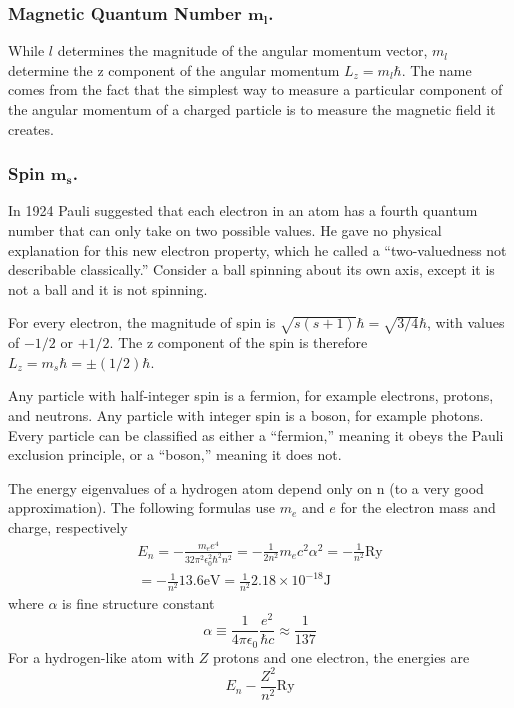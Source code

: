 \documentclass[../../../main.tex]{subfiles}
\begin{document}
\subsubsection{Magnetic Quantum Number $\boldsymbol{m_l}$.}  While $l$ determines the magnitude of the angular momentum vector, $m_l$ determine the z component of the angular momentum $L_z = m_l \hbar$. The name comes from the fact that the simplest way to measure a particular component of the angular momentum of a charged particle is to measure the magnetic field it creates.

\subsubsection{Spin $\boldsymbol{m_s}$.} In 1924 Pauli suggested that each electron in an atom has a fourth quantum number that can only take on two possible values. He gave no physical explanation for this new electron property, which he called a “two-valuedness not describable classically.” Consider a ball spinning about its own axis, except it is not a ball and it is not spinning.

For every electron, the magnitude of spin is $\sqrt{s(s + 1)}\hbar=\sqrt{3/4}\hbar$, with values of $-1/2$ or $+1/2$. The z component of the spin is therefore $L_z= m_s\hbar=\pm(1/2)\hbar$.

Any particle with half-integer spin is a fermion, for example electrons, protons, and neutrons. Any particle with integer spin is a boson, for example photons. Every particle can be classified as either a “fermion,” meaning it obeys the Pauli exclusion principle, or a “boson,” meaning it does not. 

The energy eigenvalues of a hydrogen atom depend only on n (to a very good approximation). The  following formulas use $m_e$ and $e$ for the electron mass and charge, respectively
\begin{multline*}
    E_n=-\frac{m_ee^4}{32\pi^2\epsilon_0^2
    \hbar^2n^2}=-\frac{1}{2n^2}m_ec^2\alpha^2 = -\frac{1}{n^2}\text{Ry}\\
    = -\frac{1}{n^2}13.6 \text{eV}=\frac{1}{n^2}2.18\times 10^{-18}\text{J}
\end{multline*}
where $\alpha$ is fine structure constant
\begin{equation*}
    \alpha \equiv \frac{1}{4\pi\epsilon_0}\frac{e^2}{\hbar c}\approx \frac{1}{137}
\end{equation*}
For a hydrogen-like atom with $Z$ protons and one electron, the energies are
\begin{equation*}
    E_n-\frac{Z^2}{n^2}\text{Ry}
\end{equation*}
\end{document}
